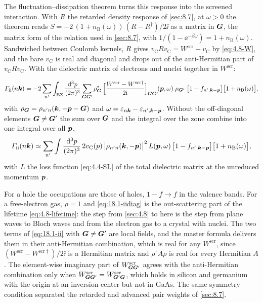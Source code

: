 The fluctuation--dissipation theorem turns this response into the screened interaction. With $R$ the retarded density response of \cref{sec:8.7}, at $\omega > 0$ the theorem reads $S = -2\,(1 + n_{\mathrm{B}}(\omega))\,(R - R^\dagger)/2\ii$ as a matrix in $\bm{G}$, the matrix form of the relation used in \cref{sec:8.7}, with $1/(1 - \ee^{-\beta\omega}) = 1 + n_{\mathrm{B}}(\omega)$. Sandwiched between Coulomb kernels, $R$ gives $v_{\mathrm{C}}Rv_{\mathrm{C}} = W^{\mathrm{scr}} - v_{\mathrm{C}}$ by \cref{eq:4.8-W}, and the bare $v_{\mathrm{C}}$ is real and diagonal and drops out of the anti-Hermitian part of $v_{\mathrm{C}}Rv_{\mathrm{C}}$. With the dielectric matrix of electrons and nuclei together in $W^{\mathrm{scr}}$:
\begin{keyresult}
\begin{equation}
  \varGamma_{\mathrm{ii}}(n\bm{k}) = -2\sum_{n'}\int_{\mathrm{BZ}}\frac{\mathrm{d}^3p}{(2\pi)^3}\sum_{\bm{G}\bm{G}'}\rho_{\bm{G}}^*\,\Bigl[\frac{W^{\mathrm{scr}} - W^{\mathrm{scr}\dagger}}{2\mathrm{i}}\Bigr]_{\bm{G}\bm{G}'}\!(\bm{p},\omega)\;\rho_{\bm{G}'}\;\bigl[1 - f_{n',\bm{k}-\bm{p}}\bigr]\bigl[1 + n_{\mathrm{B}}(\omega)\bigr] ,
  \label{eq:18.1-ii}
\end{equation}
with $\rho_{\bm{G}} = \rho_{n'n}(\bm{k},-\bm{p}-\bm{G})$ and $\omega = \varepsilon_{n\bm{k}} - \varepsilon_{n',\bm{k}-\bm{p}}$. Without the off-diagonal elements $\bm{G} \neq \bm{G}'$ the sum over $\bm{G}$ and the integral over the zone combine into one integral over all $\bm{p}$,
\begin{equation}
  \varGamma_{\mathrm{ii}}(n\bm{k}) \simeq \sum_{n'}\int\frac{\mathrm{d}^3p}{(2\pi)^3}\,2v_{\mathrm{C}}(p)\,\bigl|\rho_{n'n}(\bm{k},-\bm{p})\bigr|^2\,L(\bm{p},\omega)\,\bigl[1 - f_{n',\bm{k}-\bm{p}}\bigr]\bigl[1 + n_{\mathrm{B}}(\omega)\bigr] ,
  \label{eq:18.1-iidiag}
\end{equation}
with $L$ the loss function \cref{eq:4.4-SL} of the total dielectric matrix at the unreduced momentum $\bm{p}$.
\end{keyresult}
\noindent For a hole the occupations are those of holes, $1 - f \to f$ in the valence bands. For a free-electron gas, $\rho = 1$ and \cref{eq:18.1-iidiag} is the out-scattering part of the lifetime \cref{eq:4.8-lifetime}: the step from \cref{sec:4.8} to here is the step from plane waves to Bloch waves and from the electron gas to a crystal with nuclei. The two terms of \cref{eq:18.1-ii} with $\bm{G} \neq \bm{G}'$ are local fields, and the master formula delivers them in their anti-Hermitian combination, which is real for any $W^{\mathrm{scr}}$, since $(W^{\mathrm{scr}} - W^{\mathrm{scr}\dagger})/2\ii$ is a Hermitian matrix and $\rho^\dagger A\rho$ is real for every Hermitian $A$. The element-wise imaginary part of $W^{\mathrm{scr}}_{\bm{G}\bm{G}'}$ agrees with the anti-Hermitian combination only when $W^{\mathrm{scr}}_{\bm{G}\bm{G}'} = W^{\mathrm{scr}}_{\bm{G}'\bm{G}}$, which holds in silicon and germanium with the origin at an inversion center but not in GaAs. The same symmetry condition separated the retarded and advanced pair weights of \cref{sec:8.7}.

